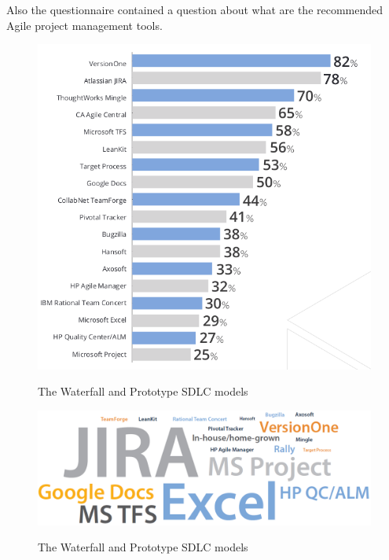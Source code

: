 	Also the questionnaire contained a question about what are the recommended Agile project management tools.
	
	\begin{figure}[H]
		\centering
		\includegraphics[width=.8\textwidth]{resources/Screenshot}\\
		\caption{The Waterfall and Prototype SDLC models}
	\end{figure}

	\begin{figure}[H]
		\centering
		\includegraphics[width=.8\textwidth]{resources/Untitled_4}\\
		\caption{The Waterfall and Prototype SDLC models}
	\end{figure}

	



